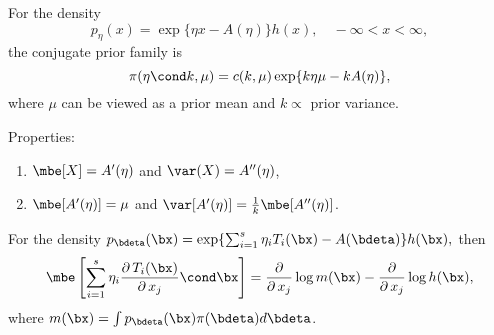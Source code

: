 

For the density $$
    p_\eta(x) = \exp\{\eta x-A(\eta)\}h(x), \quad -\infty<x<\infty,
$$
the conjugate prior family is $$
    \pi(\eta \cond k, \mu) = c(k, \mu)\exp\{k\eta\mu - kA(\eta)\},
$$
where $\mu$ can be viewed as a prior mean and $k \propto$ prior variance.

Properties: \begin{enumerate}[
        leftmargin = 2em,
    ]
    \item $\mbe[X] = A'(\eta)$ and $\var(X) = A''(\eta)$,
    \item $\mbe[A'(\eta)] = \mu$ and $\var[A'(\eta)] = \frac{1}{k}\mbe[A''(\eta)]$. 
\end{enumerate}

For the density $
    p_{\bdeta} (\bx) = \exp\{\sum_{i=1}^s\eta_i T_i(\bx) - A(\bdeta) \}h(\bx),
$
then $$
    \mbe\left[ \sum_{i=1}^s \eta_i \frac{\partial\, T_i(\bx)}{\partial\, x_j} \cond \bx\right] = \frac{\partial}{\partial\, x_j}\log m(\bx) - \frac{\partial}{\partial\, x_j} \log h(\bx),
$$
where $m(\bx) = \int p_{\bdeta}(\bx)\pi(\bdeta) d\bdeta$.